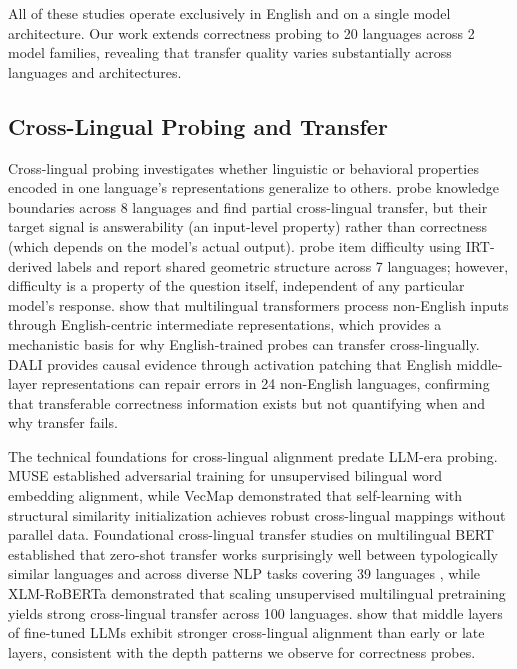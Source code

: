 All of these studies operate exclusively in English and on a single model architecture. Our work extends correctness probing to 20 languages across 2 model families, revealing that transfer quality varies substantially across languages and architectures.

\subsection{Cross-Lingual Probing and Transfer}

Cross-lingual probing investigates whether linguistic or behavioral properties encoded in one language's representations generalize to others. \citet{xiao2025knowledge} probe knowledge boundaries across 8 languages and find partial cross-lingual transfer, but their target signal is answerability (an input-level property) rather than correctness (which depends on the model's actual output). \citet{civelli2026shared} probe item difficulty using IRT-derived labels \cite{lord1980irt} and report shared geometric structure across 7 languages; however, difficulty is a property of the question itself, independent of any particular model's response. \citet{wendler2024llamas} show that multilingual transformers process non-English inputs through English-centric intermediate representations, which provides a mechanistic basis for why English-trained probes can transfer cross-lingually. DALI \cite{ravisankar2026dali} provides causal evidence through activation patching that English middle-layer representations can repair errors in 24 non-English languages, confirming that transferable correctness information exists but not quantifying when and why transfer fails.

The technical foundations for cross-lingual alignment predate LLM-era probing. MUSE \cite{conneau2018muse} established adversarial training for unsupervised bilingual word embedding alignment, while VecMap \cite{artetxe2018vecmap} demonstrated that self-learning with structural similarity initialization achieves robust cross-lingual mappings without parallel data. Foundational cross-lingual transfer studies on multilingual BERT established that zero-shot transfer works surprisingly well between typologically similar languages \cite{pires2019multilingual} and across diverse NLP tasks covering 39 languages \cite{wu2019beto}, while XLM-RoBERTa \cite{conneau2020xlmr} demonstrated that scaling unsupervised multilingual pretraining yields strong cross-lingual transfer across 100 languages.
\citet{liu2025middle} show that middle layers of fine-tuned LLMs exhibit stronger cross-lingual alignment than early or late layers, consistent with the depth patterns we observe for correctness probes.

